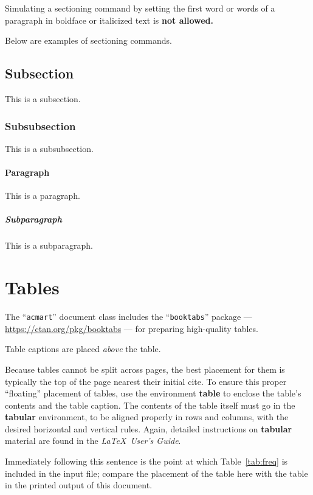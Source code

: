 \documentclass[sigconf]{acmart}
\begin{document}
Simulating a sectioning command by setting the first word or words of
a paragraph in boldface or italicized text is {\bfseries not allowed.}

Below are examples of sectioning commands.

\subsection{Subsection}
\label{sec:subsection}

This is a subsection.

\subsubsection{Subsubsection}
\label{sec:subsubsection}

This is a subsubsection.

\paragraph{Paragraph}

This is a paragraph.

\subparagraph{Subparagraph}

This is a subparagraph.

\section{Tables}

The ``\verb|acmart|'' document class includes the ``\verb|booktabs|''
package --- \url{https://ctan.org/pkg/booktabs} --- for preparing
high-quality tables.

Table captions are placed {\itshape above} the table.

Because tables cannot be split across pages, the best placement for
them is typically the top of the page nearest their initial cite.  To
ensure this proper ``floating'' placement of tables, use the
environment \textbf{table} to enclose the table's contents and the
table caption.  The contents of the table itself must go in the
\textbf{tabular} environment, to be aligned properly in rows and
columns, with the desired horizontal and vertical rules.  Again,
detailed instructions on \textbf{tabular} material are found in the
\textit{\LaTeX\ User's Guide}.

Immediately following this sentence is the point at which
Table~\ref{tab:freq} is included in the input file; compare the
placement of the table here with the table in the printed output of
this document.
\end{document}
